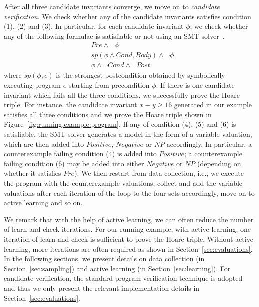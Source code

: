 After all three candidate invariants converge, we move on to \emph{candidate verification}. We check whether any of the candidate invariants satisfies condition (1), (2) and (3). In particular, for each candidate invariant $\phi$, we check whether any of the following formulae is satisfiable or not using an SMT solver~\cite{barrett2009satisfiability,de2008z3}.
\begin{align}
    & \mathit{Pre} \land \neg \phi \label{check:inv:pre} \\
     & sp(\phi \land \mathit{Cond}, \mathit{Body}) \land \neg \phi \label{check:inv:loop} \\
    & \phi \land \neg \mathit{Cond} \land \neg \mathit{Post} \label{check:inv:post}
\end{align}
where $sp(\phi,e)$ is the strongest postcondition obtained by
symbolically executing program $e$
starting from precondition $\phi$.
If there is one candidate invariant which fails all the three conditions, we successfully prove the Hoare triple. 
For instance, the candidate invariant $x - y \geq 16$ generated in our example satisfies all three conditions and we prove the Hoare triple shown in Figure~\ref{fig:running:example:program}. 
If any of condition (4), (5) and (6) is satisfiable, the SMT solver generates a model in the form of a variable valuation, 
which are then added into $\mathit{Positive}$, $\mathit{Negative}$ or $\mathit{NP}$ accordingly. 
In particular, a counterexample failing condition (4) is added into $\mathit{Positive}$; 
a counterexample failing condition (6) may be added into either $\mathit{Negative}$ or $\mathit{NP}$ (depending on whether it satisfies $\mathit{Pre}$). 
We then restart from data collection, i.e., we execute the program with the counterexample valuations, 
collect and add the variable valuations after each iteration of the loop to the four sets accordingly, move on to active learning and so on.

We remark that with the help of active learning, we can often reduce the number of learn-and-check iterations. For our running example, with active learning, one iteration of learn-and-check is sufficient to prove the Hoare triple. Without active learning, more iterations are often required as shown in Section~\ref{sec:evaluations}. In the following sections, we present details on data collection (in Section~\ref{sec:sampling}) and active learning (in Section~\ref{sec:learning}). For candidate verification, the standard program verification technique is adopted and thus we only present the relevant implementation details in Section~\ref{sec:evaluations}.

